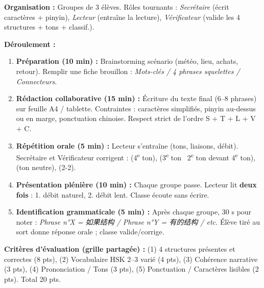 \documentclass[11pt]{article}
\newcommand{\zh}[1]{\ifmmode\text{#1}\else{#1}\fi}
\begin{document}
\begin{experience}
\textbf{Organisation :} Groupes de 3 élèves. Rôles tournants : \emph{Secrétaire} (écrit caractères + pinyin), \emph{Lecteur} (entraîne la lecture), \emph{Vérificateur} (valide les 4 structures + tons + classif.).

\textbf{Déroulement :}
\begin{enumerate}
    \item \textbf{Préparation (10 min) :} Brainstorming scénario (météo, lieu, achats, retour). Remplir une fiche brouillon : \textit{Mots-clés / 4 phrases squelettes / Connecteurs}.
    \item \textbf{Rédaction collaborative (15 min) :} Écriture du texte final (6--8 phrases) sur feuille A4 / tablette. Contraintes : caractères simplifiés, pinyin au-dessus ou en marge, ponctuation chinoise. Respect strict de l'ordre S + T + L + V + C.
    \item \textbf{Répétition orale (5 min) :} Lecteur s'entraîne (tons, liaisons, débit). Secrétaire et Vérificateur corrigent : \zh{就} (4\textsuperscript{e} ton), \zh{有} (3\textsuperscript{e} ton \textrightarrow\ 2\textsuperscript{e} ton devant 4\textsuperscript{e} ton), \zh{的} (ton neutre), \zh{法郎} (2-2).
    \item \textbf{Présentation plénière (10 min) :} Chaque groupe passe. Lecteur lit \textbf{deux fois} : 1. débit naturel, 2. débit lent. Classe écoute sans écrire.
    \item \textbf{Identification grammaticale (5 min) :} Après chaque groupe, 30 s pour noter : \textit{Phrase n°X = 如果结构 / Phrase n°Y = 有的结构 / etc.} Élève tiré au sort donne réponse orale ; classe valide/corrige.
\end{enumerate}
\textbf{Critères d'évaluation (grille partagée) :} (1) 4 structures présentes et correctes (8 pts), (2) Vocabulaire HSK 2--3 varié (4 pts), (3) Cohérence narrative (3 pts), (4) Prononciation / Tons (3 pts), (5) Ponctuation / Caractères lisibles (2 pts). Total 20 pts.
\end{experience}
\end{document}
